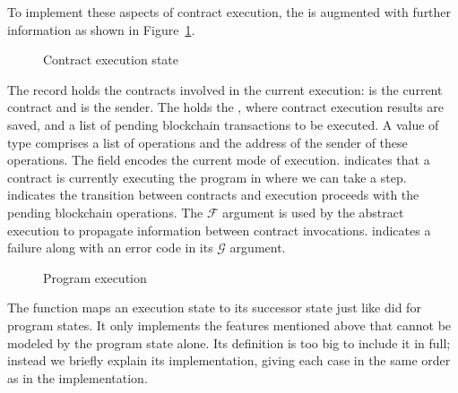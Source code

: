 To implement these aspects of contract execution, the 
is augmented with further information as shown in Figure~\ref{fig:contract-execution-state}.
\begin{figure}[tp]
  \ConcretePrgRunning
  \ConcreteTransaction
  \ConcreteRunMode
  \ConcreteExecState
  \caption{Contract execution state}
  \label{fig:contract-execution-state}
\end{figure}
The record  holds the contracts involved in the current
execution:  is the current contract and  is
the sender.
The  holds the , where contract execution results are saved,
and a list of pending blockchain transactions to be executed. A value
of type  comprises a list of operations and the
address of the sender of these operations.
The field  encodes the current mode of
execution.  indicates that a contract is currently executing
the program in  where we can take a step. 
indicates the transition between contracts and execution
proceeds with the pending blockchain operations. The $\mathcal{F}$
argument is used by the abstract execution to propagate information
between contract invocations.  indicates a failure along
with an error code in its $\mathcal{G}$ argument.

\begin{figure}[tp]
  \ConcreteExecStepProgram
  \caption{Program execution}
  \label{fig:exec-step-1}
\end{figure}
The function {\ConcreteExecStep} maps an execution state to its successor state
just like  did for program states.
It only implements the features mentioned above that cannot be modeled
by the program state alone.
Its definition is too big to include it in full; instead
we briefly explain its implementation, giving each case in the same
order as in the implementation.

